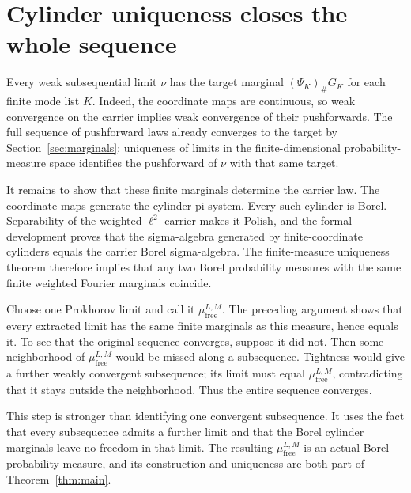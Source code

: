 \section{Cylinder uniqueness closes the whole sequence}
\label{sec:identification}

Every weak subsequential limit $\nu$ has the target marginal $(\Psi_K)_{\#}G_K$ for each finite mode list $K$. Indeed, the coordinate maps are continuous, so weak convergence on the carrier implies weak convergence of their pushforwards. The full sequence of pushforward laws already converges to the target by Section~\ref{sec:marginals}; uniqueness of limits in the finite-dimensional probability-measure space identifies the pushforward of $\nu$ with that same target.

It remains to show that these finite marginals determine the carrier law. The coordinate maps generate the cylinder pi-system. Every such cylinder is Borel. Separability of the weighted $\ell^2$ carrier makes it Polish, and the formal development proves that the sigma-algebra generated by finite-coordinate cylinders equals the carrier Borel sigma-algebra. The finite-measure uniqueness theorem therefore implies that any two Borel probability measures with the same finite weighted Fourier marginals coincide.

Choose one Prokhorov limit and call it $\mu_{\mathrm{free}}^{L,M}$. The preceding argument shows that every extracted limit has the same finite marginals as this measure, hence equals it. To see that the original sequence converges, suppose it did not. Then some neighborhood of $\mu_{\mathrm{free}}^{L,M}$ would be missed along a subsequence. Tightness would give a further weakly convergent subsequence; its limit must equal $\mu_{\mathrm{free}}^{L,M}$, contradicting that it stays outside the neighborhood. Thus the entire sequence converges.

This step is stronger than identifying one convergent subsequence. It uses the fact that every subsequence admits a further limit and that the Borel cylinder marginals leave no freedom in that limit. The resulting $\mu_{\mathrm{free}}^{L,M}$ is an actual Borel probability measure, and its construction and uniqueness are both part of Theorem~\ref{thm:main}.

